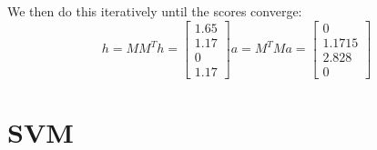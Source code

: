 \documentclass{article}
\begin{document}
\begin{enumerate}[label=(\alph*)]
    We then do this iteratively until the scores converge:
    \begin{equation*}
        h = MM^T h = \begin{bmatrix}
            1.65 \\
            1.17 \\
            0 \\
            1.17
        \end{bmatrix}
        a = M^TM a = \begin{bmatrix}
            0 \\
            1.1715 \\
            2.828 \\
            0
        \end{bmatrix}
    \end{equation*}
\end{enumerate}

\section{SVM}
\end{document}
